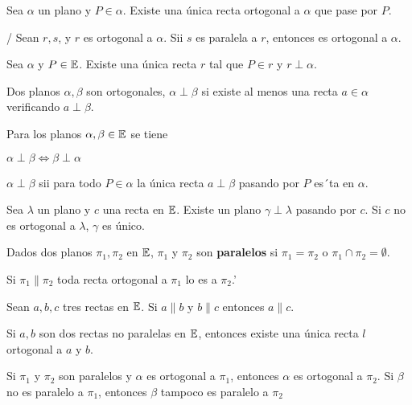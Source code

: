   Sea $\alpha$ un plano y $P \in \alpha$. Existe una única recta ortogonal a $\alpha$ que pase por $P$.
 
 / Sean $r,s$, y $r$ es ortogonal a $\alpha$. Sii $s$ es paralela a $r$, entonces es ortogonal a $\alpha$.
 
 Sea $\alpha$ y $P \in \mathbb{E}$. Existe una única recta $r$ tal que $P \in r$ y $r\perp \alpha$.  
 
   Dos planos $\alpha, \beta$ son ortogonales, $\alpha \perp \beta$ si existe al menos una recta $a \in \alpha$ verificando $a \perp \beta$.
 
  Para los planos $\alpha, \beta \in \mathbb{E}$ se tiene
 \begin{itemizex}
 	\item $\alpha \perp \beta \iff \beta \perp \alpha$
 	\item $\alpha \perp \beta$ sii para todo $P  \in \alpha$ la única recta $a \perp \beta$ pasando por $P$ es´ta en $\alpha$.
 \end{itemizex}

 Sea $\lambda$ un plano y $c$ una recta en $\mathbb{E}$. Existe un plano $\gamma \perp \lambda$ pasando por $c$. Si $c$ no es ortogonal a $\lambda$, $\gamma$ es único.

 Dados dos planos $\pi_1, \pi_2$ en $\mathbb{E}$, $\pi_1$ y $\pi_2$ son \textbf{paralelos}
 si $\pi_1 = \pi_2$ o $\pi_1 \cap \pi_2 =  \emptyset$.
 
  Si $\pi_1 \parallel \pi_2$ toda recta ortogonal a $\pi_1$ lo es a $\pi_2$.'
 
  Sean $a,b,c$ tres rectas en $\mathbb{E}$. Si $a\parallel b$ y $b\parallel c$ entonces $a\parallel c$.
 
  Si $a,b$ son dos rectas no paralelas en $\mathbb{E}$, entonces existe una única recta $l$ ortogonal a $a$ y $b$.
 
  Si $\pi_1$ y $\pi_2$ son paralelos y $\alpha$ es ortogonal a $\pi_1$, entonces $\alpha$ es ortogonal a $\pi_2$. Si $\beta$ no es paralelo a $\pi_1$, entonces $\beta$ tampoco es paralelo a $\pi_2$